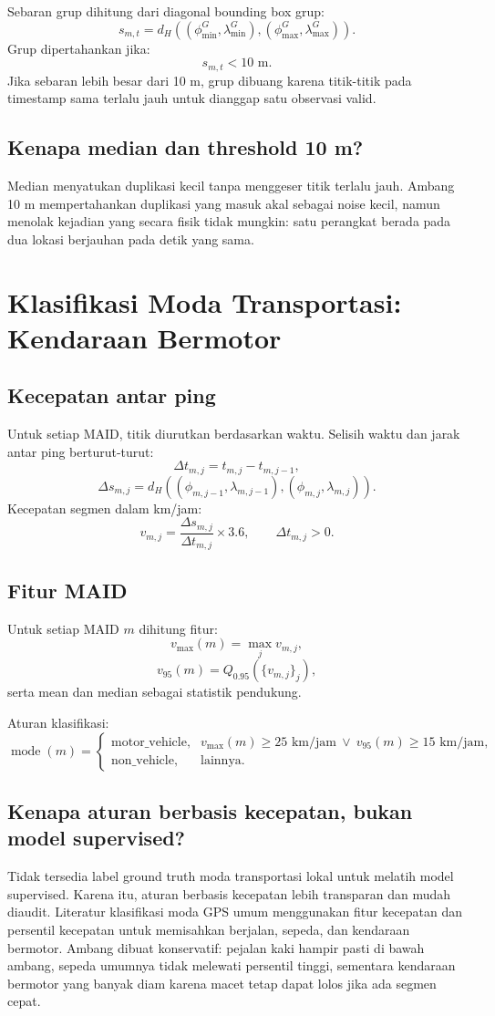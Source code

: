 \documentclass[11pt,a4paper]{article}
\begin{document}
Sebaran grup dihitung dari diagonal bounding box grup:
\[
s_{m,t}=d_H\left((\phi_{\min}^{G},\lambda_{\min}^{G}), (\phi_{\max}^{G},\lambda_{\max}^{G})\right).
\]
Grup dipertahankan jika:
\[
s_{m,t}<10\text{ m}.
\]
Jika sebaran lebih besar dari 10 m, grup dibuang karena titik-titik pada timestamp sama terlalu jauh untuk dianggap satu observasi valid.

\subsection{Kenapa median dan threshold 10 m?}
Median menyatukan duplikasi kecil tanpa menggeser titik terlalu jauh. Ambang 10 m mempertahankan duplikasi yang masuk akal sebagai noise kecil, namun menolak kejadian yang secara fisik tidak mungkin: satu perangkat berada pada dua lokasi berjauhan pada detik yang sama.

\section{Klasifikasi Moda Transportasi: Kendaraan Bermotor}
\subsection{Kecepatan antar ping}
Untuk setiap MAID, titik diurutkan berdasarkan waktu. Selisih waktu dan jarak antar ping berturut-turut:
\[
\Delta t_{m,j}=t_{m,j}-t_{m,j-1},
\]
\[
\Delta s_{m,j}=d_H((\phi_{m,j-1},\lambda_{m,j-1}), (\phi_{m,j},\lambda_{m,j})).
\]
Kecepatan segmen dalam km/jam:
\[
v_{m,j}=\frac{\Delta s_{m,j}}{\Delta t_{m,j}}\times 3.6,
\qquad \Delta t_{m,j}>0.
\]

\subsection{Fitur MAID}
Untuk setiap MAID $m$ dihitung fitur:
\[
v_{\max}(m)=\max_j v_{m,j},
\]
\[
v_{95}(m)=Q_{0.95}(\{v_{m,j}\}_j),
\]
serta mean dan median sebagai statistik pendukung.

Aturan klasifikasi:
\[
\operatorname{mode}(m)=
\begin{cases}
\text{motor\_vehicle}, & v_{\max}(m)\geq25\text{ km/jam}\ \lor\ v_{95}(m)\geq15\text{ km/jam},\\
\text{non\_vehicle}, & \text{lainnya.}
\end{cases}
\]

\subsection{Kenapa aturan berbasis kecepatan, bukan model supervised?}
Tidak tersedia label ground truth moda transportasi lokal untuk melatih model supervised. Karena itu, aturan berbasis kecepatan lebih transparan dan mudah diaudit. Literatur klasifikasi moda GPS umum menggunakan fitur kecepatan dan persentil kecepatan untuk memisahkan berjalan, sepeda, dan kendaraan bermotor. Ambang dibuat konservatif: pejalan kaki hampir pasti di bawah ambang, sepeda umumnya tidak melewati persentil tinggi, sementara kendaraan bermotor yang banyak diam karena macet tetap dapat lolos jika ada segmen cepat.
\end{document}
